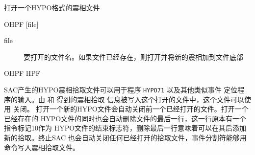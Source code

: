 \label{cmd:ohpf}

打开一个HYPO格式的震相文件

\begin{SACSTX}
OHPF [file]
\end{SACSTX}

\begin{description}
\item [file] 要打开的文件名。如果文件已经存在，则打开并将新的震相加到文件底部
\end{description}

\begin{SACDFT}
OHPF HPF
\end{SACDFT}

SAC产生的HYPO震相拾取文件可以用于程序 \texttt{HYPO71} 以及其他类似事件
定位程序的输入。由  和  得到的震相拾取
信息被写入这个打开的文件中，这个文件可以使用  关闭。
打开一个新的HYPO文件会自动关闭前一个已经打开的文件。打开一个已经存在的
HYPO文件的同时也会自动删除文件的最后一行，这一行原本有一个指令标记10作为
HYPO文件的结束标志符，删除最后一行意味着可以在其后添加新的拾取。终止SAC
也会自动关闭任何已经打开的拾取文件，事件分割符能够用 
命令写入震相拾取文件。
